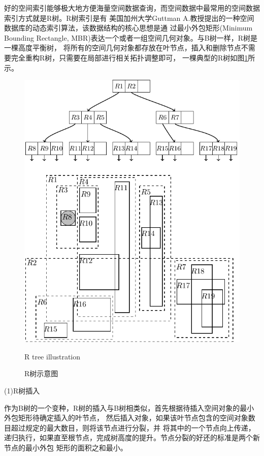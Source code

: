 好的空间索引能够极大地方便海量空间数据查询，而空间数据中最常用的空间数据索引方式就是R树。R树索引是有
美国加州大学Guttman A.教授提出的一种空间数据库的动态索引算法\cite{Guttman1984R}，该数据结构的核心思想是通
过最小外包矩形(Minimum Bounding Rectangle, MBR)表达一个或者一组空间几何对象。与B树一样，R树是一棵高度平衡树，
将所有的空间几何对象都存放在叶节点，插入和删除节点不需要完全重构R树，只需要在局部进行相关拓扑调整即可，
一棵典型的R树如图\ref{fig:rtree}所示。
\begin{figure}
\centering
\includegraphics[scale=0.8]{figures/rtree.pdf}\\
\caption{R树示意图}{R tree illustration}
\label{fig:rtree}
\end{figure}

(1)R树插入

作为B树的一个变种，R树的插入与B树相类似，首先根据待插入空间对象的最小外包矩形待确定插入的叶节点，
然后插入对象，如果该叶节点包含的空间对象数目超过规定的最大数目，则将该节点进行分裂\cite{Huang2001Optimizing}，并
将其中的一个节点向上传递，递归执行，如果直至根节点，完成树高度的提升。节点分裂的好还的标准是两个新节点的最小外包
矩形的面积之和最小。

